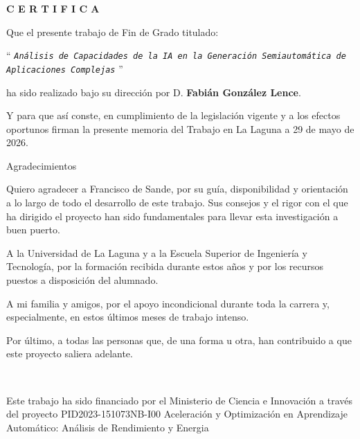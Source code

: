 \documentclass[english,a4paper,12pt,oneside]{extreport}
\newcommand{\TitleTopic}{%
  \texttt{Análisis de Capacidades de la IA en la Generación Semiautomática de Aplicaciones Complejas}%
}
\begin{document}
\bigskip

\bigskip
\bigskip
{\bf C E R T I F I C A}

\bigskip
\bigskip
\bigskip
Que el presente trabajo de Fin de Grado titulado:

\bigskip
``{\it \TitleTopic{}}''

\bigskip
\bigskip
\bigskip
\noindent ha sido realizado bajo su dirección por D. {\bf Fabián González Lence}.

\bigskip
\bigskip

Y para que así conste, en cumplimiento de la legislación vigente y a los efectos
oportunos firman la presente memoria del Trabajo en La Laguna a 29 de mayo de 2026.

\newpage
\thispagestyle{empty}

{ \flushright

\begin{LARGE}
Agradecimientos
\end{LARGE}
\hspace{3mm}
\begin{large}
\hspace{3mm}
\vspace*{0.3cm}

\hspace{3mm}
Quiero agradecer a Francisco de Sande, por su guía, disponibilidad y orientación a lo largo de todo el desarrollo de este trabajo. Sus consejos y el rigor con el que ha dirigido el proyecto han sido fundamentales para llevar esta investigación a buen puerto.
\vspace*{0.3cm}

A la Universidad de La Laguna y a la Escuela Superior de Ingeniería y Tecnología, por la formación recibida durante estos años y por los recursos puestos a disposición del alumnado.
\vspace*{0.3cm}

A mi familia y amigos, por el apoyo incondicional durante toda la carrera y, especialmente, en estos últimos meses de trabajo intenso.
\vspace*{0.3cm}

Por último, a todas las personas que, de una forma u otra, han contribuido a que este proyecto saliera adelante.

­\newline

Este trabajo ha sido financiado por el Ministerio de Ciencia e Innovación a través del proyecto
PID2023-151073NB-I00 Aceleración y Optimización en Aprendizaje Automático: Análisis de Rendimiento y Energia

\end{large}
}
\end{document}
